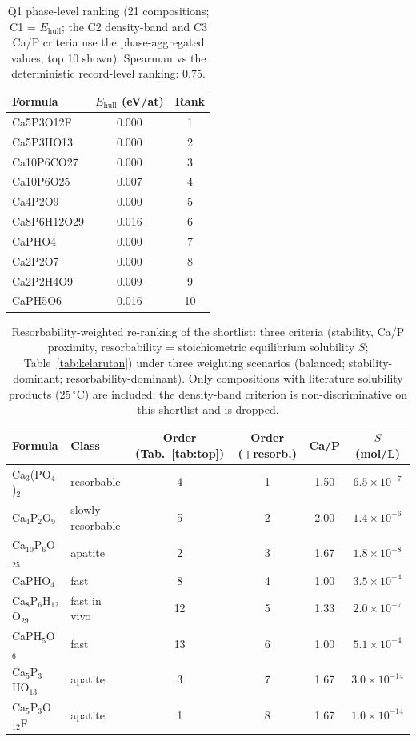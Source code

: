 \documentclass[review,11pt,a4paper]{elsarticle}
\begin{document}
\begin{table}[ht]
\centering\small
\caption{Q1 phase-level ranking (21 compositions; C1 = $E_\mathrm{hull}$; the C2 density-band and C3 Ca/P criteria use the phase-aggregated values; top 10 shown). Spearman vs the deterministic record-level ranking: 0.75.}
\label{tab:top_q1}
\begin{tabular}{lcc}
\toprule
Formula & $E_\mathrm{hull}$ (eV/at) & Rank \\
\midrule
Ca5P3O12F & 0.000 & 1 \\
Ca5P3HO13 & 0.000 & 2 \\
Ca10P6CO27 & 0.000 & 3 \\
Ca10P6O25 & 0.007 & 4 \\
Ca4P2O9 & 0.000 & 5 \\
Ca8P6H12O29 & 0.016 & 6 \\
CaPHO4 & 0.000 & 7 \\
Ca2P2O7 & 0.000 & 8 \\
Ca2P2H4O9 & 0.009 & 9 \\
CaPH5O6 & 0.016 & 10 \\
\bottomrule
\end{tabular}
\end{table}


\begin{table}[ht]
\centering\small
\caption{Resorbability-weighted re-ranking of the shortlist: three criteria (stability, Ca/P proximity, resorbability = stoichiometric equilibrium solubility $S$; Table~\ref{tab:kelarutan}) under three weighting scenarios (balanced; stability-dominant; resorbability-dominant). Only compositions with literature solubility products (25\,$^\circ$C) are included; the density-band criterion is non-discriminative on this shortlist and is dropped.}
\label{tab:resorb_rank}
\begin{tabular}{llcccc}
\toprule
Formula & Class & Order (Tab.~\ref{tab:top}) & Order (+resorb.) & Ca/P & $S$ (mol/L) \\
\midrule
Ca$_3$(PO$_4$)$_2$ & resorbable & 4 & 1 & 1.50 & $6.5\times10^{-7}$ \\
Ca$_4$P$_2$O$_9$ & slowly resorbable & 5 & 2 & 2.00 & $1.4\times10^{-6}$ \\
Ca$_{10}$P$_6$O$_{25}$ & apatite & 2 & 3 & 1.67 & $1.8\times10^{-8}$ \\
CaPHO$_4$ & fast & 8 & 4 & 1.00 & $3.5\times10^{-4}$ \\
Ca$_8$P$_6$H$_{12}$O$_{29}$ & fast in vivo & 12 & 5 & 1.33 & $2.0\times10^{-7}$ \\
CaPH$_5$O$_6$ & fast & 13 & 6 & 1.00 & $5.1\times10^{-4}$ \\
Ca$_5$P$_3$HO$_{13}$ & apatite & 3 & 7 & 1.67 & $3.0\times10^{-14}$ \\
Ca$_5$P$_3$O$_{12}$F & apatite & 1 & 8 & 1.67 & $1.0\times10^{-14}$ \\
\bottomrule
\end{tabular}
\end{table}
\end{document}
